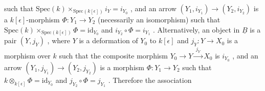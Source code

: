 \begin{center}
\end{center}
such that $\mathrm{Spec}(k) \times_{\mathrm{Spec}(k[\epsilon])} i_Y = i_{Y_0}$ , and an arrow $(Y_1, i_{Y_1}) \to (Y_2, i_{Y_2})$ is a $k[\epsilon]$-morphism $\Phi : Y_1 \to Y_2$ (necessarily an isomorphism) such that $\mathrm{Spec}(k) \times_{\mathrm{Spec}(k[\epsilon])} \Phi = \mathrm{id}_{Y_0}$ and $i_{Y_2} \circ \Phi = i_{Y_1}$ . Alternatively, an object in $\underline{B}$ is a pair $(Y, j_Y)$ , where $Y$ is a deformation of $Y_0$ to $k[\epsilon]$ and $j_Y : Y \to X_0$ is a morphism over $k$ such that the composite morphism $Y_0 \to Y \xrightarrow{\;j_Y\;} X_0$ is $i_{Y_0}$ , and an arrow $(Y_1, j_{Y_1}) \to (Y_2, j_{Y_2})$ is a morphism $\Phi : Y_1 \to Y_2$ such that $k \otimes_{k[\epsilon]} \Phi = \mathrm{id}_{Y_0}$ and $j_{Y_2} \circ \Phi = j_{Y_1}$ . Therefore the association

